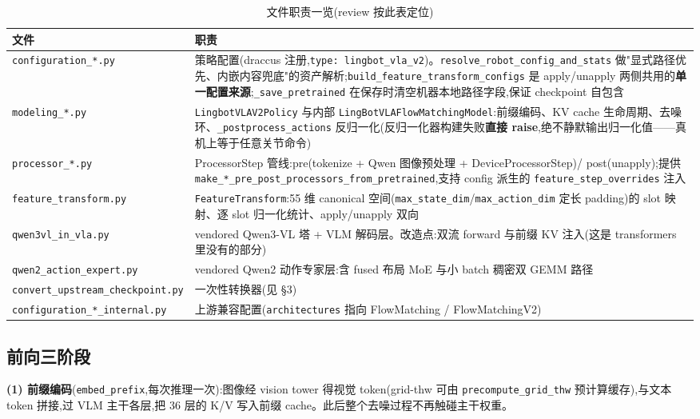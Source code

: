\documentclass[11pt]{ctexart}
\begin{document}
\begin{table}[htbp]\centering\small
\caption{文件职责一览(review 按此表定位)}
\begin{tabular}{@{}lp{10.6cm}@{}}
\toprule
\textbf{文件} & \textbf{职责} \\
\midrule
\texttt{configuration\_*.py} & 策略配置(draccus 注册,\texttt{type: lingbot\_vla\_v2})。\texttt{resolve\_robot\_config\_and\_stats} 做"显式路径优先、内嵌内容兜底"的资产解析;\texttt{build\_feature\_transform\_configs} 是 apply/unapply 两侧共用的\textbf{单一配置来源};\texttt{\_save\_pretrained} 在保存时清空机器本地路径字段,保证 checkpoint 自包含 \\
\texttt{modeling\_*.py} & \texttt{LingbotVLAV2Policy} 与内部 \texttt{LingBotVLAFlowMatchingModel}:前缀编码、KV cache 生命周期、去噪环、\texttt{\_postprocess\_actions} 反归一化(反归一化器构建失败\textbf{直接 raise},绝不静默输出归一化值——真机上等于任意关节命令) \\
\texttt{processor\_*.py} & ProcessorStep 管线:pre(tokenize + Qwen 图像预处理 + DeviceProcessorStep)/ post(unapply);提供 \texttt{make\_*\_pre\_post\_processors\_from\_pretrained},支持 config 派生的 \texttt{feature\_step\_overrides} 注入 \\
\texttt{feature\_transform.py} & \texttt{FeatureTransform}:55 维 canonical 空间(\texttt{max\_state\_dim}/\texttt{max\_action\_dim} 定长 padding)的 slot 映射、逐 slot 归一化统计、apply/unapply 双向 \\
\texttt{qwen3vl\_in\_vla.py} & vendored Qwen3-VL 塔 + VLM 解码层。改造点:双流 forward 与前缀 KV 注入(这是 transformers 里没有的部分) \\
\texttt{qwen2\_action\_expert.py} & vendored Qwen2 动作专家层:含 fused 布局 MoE 与小 batch 稠密双 GEMM 路径 \\
\texttt{convert\_upstream\_checkpoint.py} & 一次性转换器(见 §3) \\
\texttt{configuration\_*\_internal.py} & 上游兼容配置(\texttt{architectures} 指向 FlowMatching / FlowMatchingV2) \\
\bottomrule
\end{tabular}
\end{table}

\subsection{前向三阶段}

\textbf{(1) 前缀编码}(\texttt{embed\_prefix},每次推理一次):图像经 vision tower 得视觉 token(grid-thw 可由 \texttt{precompute\_grid\_thw} 预计算缓存),与文本 token 拼接,过 VLM 主干各层,把 36 层的 K/V 写入前缀 cache。此后整个去噪过程不再触碰主干权重。
\end{document}
